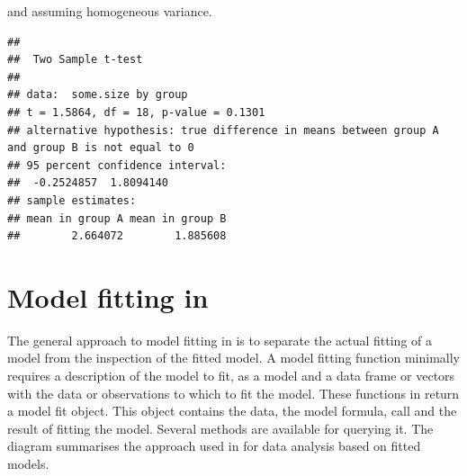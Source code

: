 \documentclass[krantz2]{krantz}\usepackage{knitr}
\begin{document}
and assuming homogeneous variance.

\begin{knitrout}\footnotesize
{}\color{fgcolor}\begin{kframe}
\begin{alltt}
 \hlopt{~}   \hlstd{=} \hlstd{,}  
\end{alltt}
\begin{verbatim}
## 
## 	Two Sample t-test
## 
## data:  some.size by group
## t = 1.5864, df = 18, p-value = 0.1301
## alternative hypothesis: true difference in means between group A and group B is not equal to 0
## 95 percent confidence interval:
##  -0.2524857  1.8094140
## sample estimates:
## mean in group A mean in group B 
##        2.664072        1.885608
\end{verbatim}
\end{kframe}
\end{knitrout}


\section[Model fitting in R]{Model fitting in \Rlang}\label{sec:stat:mf}
The general approach to model fitting in \Rlang is to separate the actual fitting of a model from the inspection of the fitted model. A model fitting function minimally requires a description of the model to fit, as a model  and a data frame or vectors with the data or observations to which to fit the model. These functions in \Rlang return a model fit object. This object contains the data, the model formula, call and the result of fitting the model. Several methods are available for querying it. The diagram summarises the approach used in \Rlang for data analysis based on fitted models.

\begin{center}
\begin{small}
\end{small}
\end{center}
\end{document}
